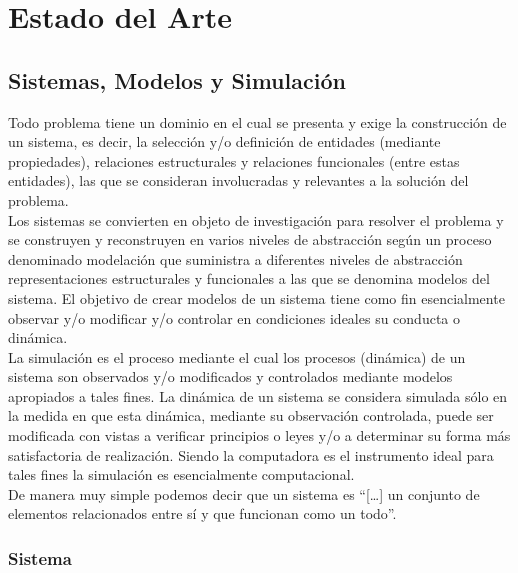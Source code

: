 \chapter{Estado del Arte}\label{chapter:state-of-the-art}

\section{Sistemas, Modelos y Simulación}

Todo problema tiene un dominio en el cual se presenta y exige la construcción de un sistema, es decir, la selección y/o definición de entidades (mediante propiedades), relaciones estructurales y relaciones funcionales (entre estas entidades), las que se consideran involucradas y relevantes a la solución del problema. \parencite{temasdesimulacion} \\

Los sistemas se convierten en objeto de investigación para resolver el problema y se construyen y reconstruyen en varios niveles de abstracción según un proceso denominado modelación que suministra a diferentes niveles de abstracción representaciones estructurales y funcionales a las que se denomina modelos del sistema. El objetivo de crear modelos de un sistema tiene como fin esencialmente observar y/o modificar y/o controlar en condiciones ideales su conducta o dinámica. \parencite{temasdesimulacion} \\

La simulación es el proceso mediante el cual los procesos (dinámica) de un sistema son observados y/o modificados y controlados mediante modelos apropiados a tales fines. La dinámica de un sistema se considera simulada sólo en la medida en que esta dinámica, mediante su observación controlada, puede ser modificada con vistas a verificar principios o leyes y/o a determinar su forma más satisfactoria de realización. Siendo la computadora es el instrumento ideal para tales fines la simulación es esencialmente computacional. \parencite{temasdesimulacion} \\

De manera muy simple podemos decir que un sistema es  “[…] un conjunto de elementos relacionados entre sí y que funcionan como un todo”. \parencite{noauthor_simulacion_nodate} \\

\subsection{Sistema}

